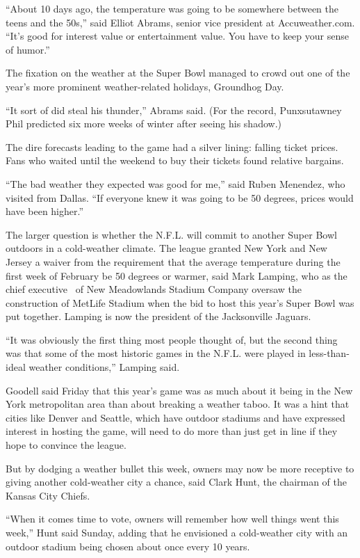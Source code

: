 ``About 10 days ago, the temperature was going to be somewhere between
the teens and the 50s,'' said Elliot Abrams, senior vice president at
Accuweather.com. ``It's good for interest value or entertainment value.
You have to keep your sense of humor.''

The fixation on the weather at the Super Bowl managed to crowd out one
of the year's more prominent weather-related holidays, Groundhog Day.

``It sort of did steal his thunder,'' Abrams said. (For the record,
Punxsutawney Phil predicted six more weeks of winter after seeing his
shadow.)

The dire forecasts leading to the game had a silver lining: falling
ticket prices. Fans who waited until the weekend to buy their tickets
found relative bargains.

``The bad weather they expected was good for me,'' said Ruben Menendez,
who visited from Dallas. ``If everyone knew it was going to be 50
degrees, prices would have been higher.''

The larger question is whether the N.F.L. will commit to another Super
Bowl outdoors in a cold-weather climate. The league granted New York and
New Jersey a waiver from the requirement that the average temperature
during the first week of February be 50 degrees or warmer, said Mark
Lamping, who as the chief executive ~of New Meadowlands Stadium Company
oversaw the construction of MetLife Stadium when the bid to host this
year's Super Bowl was put together. Lamping is now the president of the
Jacksonville Jaguars.

``It was obviously the first thing most people thought of, but the
second thing was that some of the most historic games in the N.F.L. were
played in less-than-ideal weather conditions,'' Lamping said.

Goodell said Friday that this year's game was as much about it being in
the New York metropolitan area than about breaking a weather taboo. It
was a hint that cities like Denver and Seattle, which have outdoor
stadiums and have expressed interest in hosting the game, will need to
do more than just get in line if they hope to convince the league.

But by dodging a weather bullet this week, owners may now be more
receptive to giving another cold-weather city a chance, said Clark Hunt,
the chairman of the Kansas City Chiefs.

``When it comes time to vote, owners will remember how well things went
this week,'' Hunt said Sunday, adding that he envisioned a cold-weather
city with an outdoor stadium being chosen about once every 10 years.

